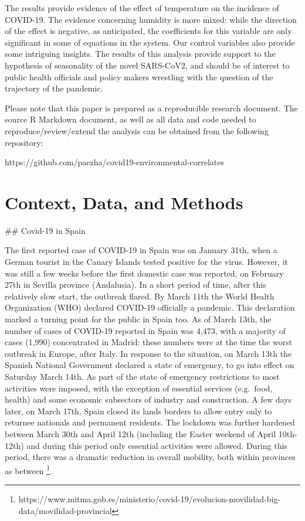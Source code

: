 \documentclass[]{elsarticle} %
\begin{document}
The results provide evidence of the effect of temperature on the
incidence of COVID-19. The evidence concerning humidity is more mixed:
while the direction of the effect is negative, as anticipated, the
coefficients for this variable are only significant in some of equations
in the system. Our control variables also provide some intriguing
insights. The results of this analysis provide support to the hypothesis
of seasonality of the novel SARS-CoV2, and should be of interest to
public health officials and policy makers wrestling with the question of
the trajectory of the pandemic.

Please note that this paper is prepared as a reproducible research
document. The source R Markdown document, as well as all data and code
needed to reproduce/review/extend the analysis can be obtained from the
following repository:

https://github.com/paezha/covid19-environmental-correlates

\hypertarget{context-data-and-methods}{%
\section{Context, Data, and Methods}\label{context-data-and-methods}}

\#\# Covid-19 in Spain

The first reported case of COVID-19 in Spain was on January 31th, when a
German tourist in the Canary Islands tested positive for the virus.
However, it was still a few weeks before the first domestic case was
reported, on February 27th in Sevilla province (Andalusia). In a short
period of time, after this relatively slow start, the outbreak flared.
By March 11th the World Health Organization (WHO) declared COVID-19
officially a pandemic. This declaration marked a turning point for the
public in Spain too. As of March 13th, the number of cases of COVID-19
reported in Spain was 4,473, with a majority of cases (1,990)
concentrated in Madrid: these numbers were at the time the worst
outbreak in Europe, after Italy. In response to the situation, on March
13th the Spanish National Government declared a state of emergency, to
go into effect on Saturday March 14th. As part of the state of emergency
restrictions to most activities were imposed, with the exception of
essential services (e.g.~food, health) and some economic subsectors of
industry and construction. A few days later, on March 17th, Spain closed
its lands borders to allow entry only to returnee nationals and
permanent residents. The lockdown was further hardened between March
30th and April 12th (including the Easter weekend of April 10th-12th)
and during this period only essential activities were allowed. During
this period, there was a dramatic reduction in overall mobility, both
within provinces as between
\footnote{https://www.mitma.gob.es/ministerio/covid-19/evolucion-movilidad-big-data/movilidad-provincial}.
\end{document}
